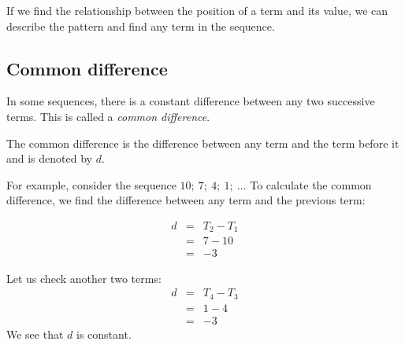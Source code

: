 If we find the relationship between the position of a term and its value, we can describe the pattern and find any term in the sequence.

\subsection*{Common difference}
In some sequences, there is a constant difference between any two
successive terms. This is called a \textit{common difference}.

 {The common difference is the difference between any term and the term before it and is denoted by $d$. } 

For example, consider the sequence $10;~7;~4;~1;~\ldots$ To calculate
the common difference, we find the difference between any term and the
previous term:

\begin{equation*}
    \begin{array}{ccl}d &=& T_{2} - T_{1}\\
      & =& 7-10\\& =&-3\end{array}
\end{equation*}

Let us check another two terms:
\begin{equation*}
    \begin{array}{ccl}d &=& T_{4} - T_{3}\\
    & =& 1-4\\& =&-3\end{array}
\end{equation*}
We see that $d$ is constant.

       
